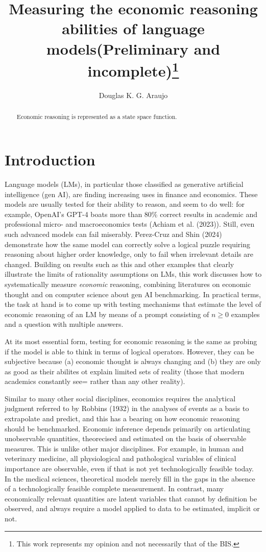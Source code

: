 \documentclass[
]{article}
\title{Measuring the economic reasoning abilities of language
models\newline(Preliminary and incomplete)\thanks{This work represents
my opinion and not necessarily that of the BIS.}}
\author{Douglas K. G. Araujo}
\affil{%
                  Bank for International
Settlements, douglas.araujo@bis.org
              }
\date{}
\begin{document}
\maketitle
\begin{abstract}
Economic reasoning is represented as a state space function.
\end{abstract}

\section{Introduction}\label{introduction}

Language models (LMs), in particular those classified as generative
artificial intelligence (gen AI), are finding increasing uses in finance
and economics. These models are usually tested for their ability to
reason, and seem to do well: for example, OpenAI's GPT-4 boats more than
80\% correct results in academic and professional micro- and
macroeconomics tests (Achiam et al. (2023)). Still, even such advanced
models can fail miserably. Perez-Cruz and Shin (2024) demonstrate how
the same model can correctly solve a logical puzzle requiring reasoning
about higher order knowledge, only to fail when irrelevant details are
changed. Building on results such as this and other examples that
clearly illustrate the limits of rationality assumptions on LMs, this
work discusses how to systematically measure \emph{economic} reasoning,
combining literatures on economic thought and on computer science about
gen AI benchmarking. In practical terms, the task at hand is to come up
with testing mechanisms that estimate the level of economic reasoning of
an LM by means of a prompt consisting of \(n \geq 0\) examples and a
question with multiple answers.

At its most essential form, testing for economic reasoning is the same
as probing if the model is able to think in terms of logical operators.
However, they can be subjective because (a) economic thought is always
changing and (b) they are only as good as their abilites ot explain
limited sets of reality (those that modern academics constantly see=
rather than any other reality).

Similar to many other social disciplines, economics requires the
analytical judgment referred to by Robbins (1932) in the analyses of
events as a basis to extrapolate and predict, and this has a bearing on
how economic reasoning should be benchmarked. Economic inference depends
primarily on articulating unobservable quantities, theorecised and
estimated on the basis of observable measures. This is unlike other
major disciplines. For example, in human and veterinary medicine, all
physiological and pathological variables of clinical importance are
observable, even if that is not yet technologically feasible today. In
the medical sciences, theoretical models merely fill in the gaps in the
absence of a technologically feasible complete measurement. In contrast,
many economically relevant quantities are latent variables that cannot
by definition be observed, and always require a model applied to data to
be estimated, implicit or not.
\end{document}
